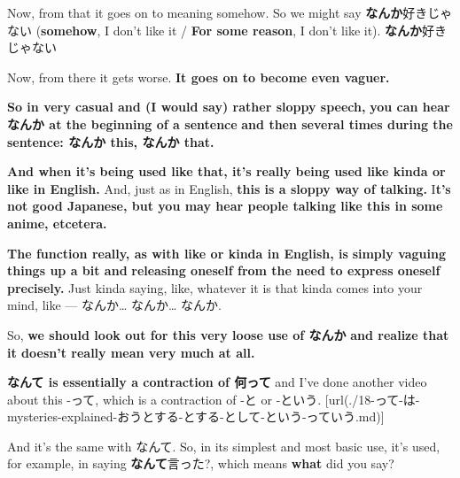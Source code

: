 \startsectionlevel[title={なんか as somehow / for some reason},reference={なんか-as-somehow-for-some-reason}]

Now, from that it goes on to meaning somehow. So we might say {\bf なんか}好きじゃない ({\bf somehow}, I don't like it / {\bf For some reason}, I don't like it). {\bf なんか}好きじゃない

\stopsectionlevel

\startsectionlevel[title={なんか in very casual / sloppy speech as kinda x},reference={なんか-in-very-casual-sloppy-speech-as-kinda-x}]

Now, from there it gets worse. {\bf It goes on to become even vaguer.}

{}

{\bf So in very casual and (I would say) rather sloppy speech,} {\bf you can hear なんか at the beginning of a sentence} {\bf and then several times during the sentence: なんか this, なんか that.}

\thinrule

{\bf And when it's being used like that, it's really being used like kinda or like in English.} And, just as in English, {\bf this is a sloppy way of talking.} I{\bf t's not good Japanese, but you may hear people talking like this in some anime, etcetera.}

{\bf The function really, as with like or kinda in English, is} {\bf simply vaguing things up a bit and} {\bf releasing oneself from the need to express oneself precisely.} Just kinda saying, like, whatever it is that kinda comes into your mind, like --- なんか\ldots{} なんか\ldots{} なんか.

So, {\bf we should look out for this very loose use of なんか} {\bf and realize that it doesn't really mean very much at all.}

\stopsectionlevel

\stopsectionlevel

\startsectionlevel[title={なんて},reference={なんて}]

{\bf なんて is essentially a contraction of 何って} and I've done another video about this -って, which is a contraction of -と or -という. \goto{{[}18{]}}[url(./18-って-は-mysteries-explained-おうとする-とする-として-という-っていう.md)]

{}

And it's the same with なんて. So, in its simplest and most basic use, it's used, for example, in saying {\bf なんて}言った?, which means {\bf what} did you say?

